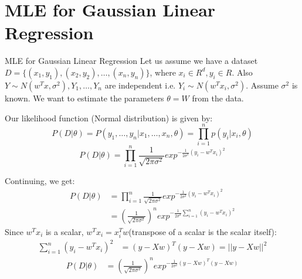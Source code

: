 \documentclass[handout]{beamer}
\begin{document}
\section{MLE for Gaussian Linear Regression}
\begin{frame}{MLE for Gaussian Linear Regression}
Let us assume we have a dataset $D = \{(x_1, y_1), (x_2,y_2), \ldots, (x_n, y_n)\}$, where $x_i\in R^d, y_i\in R$. Also $Y\sim N(w^Tx, \sigma^2), Y_1, \ldots, Y_n$ are independent i.e. $Y_i\sim N(w^Tx_i, \sigma^2)$. Assume $\sigma^2$ is known.
We want to estimate the parameters $\theta = W$ from the data.

Our likelihood function (Normal distribution) is given by:
\begin{equation}
P(D|\theta) = P(y_1,\ldots,y_n|x_1,\ldots,x_n,\theta) = \prod_{i=1}^n p(y_i|x_i, \theta) 
\end{equation}
\begin{equation}
P(D|\theta) = \prod_{i=1}^n\frac{1}{\sqrt{2\pi\sigma^2}}exp^{-\frac{1}{2\sigma^2}(y_i-w^Tx_i)^2}
\end{equation}

\end{frame}

\begin{frame}
    Continuing, we get:
    \begin{align*}
        P(D|\theta) &= \prod_{i=1}^n\frac{1}{\sqrt{2\pi\sigma^2}}exp^{-\frac{1}{2\sigma^2}(y_i-w^Tx_i)^2} \\
        &= \left(\frac{1}{\sqrt{2\pi\sigma^2}}\right)^{n}exp^{-\frac{1}{2\sigma^2}\sum_{i=1}^n(y_i-w^Tx_i)^2} 
    \end{align*}
    Since $w^Tx_i$ is a scalar, $w^Tx_i = x_i^Tw$(transpose of a scalar is the scalar itself):
    \begin{align*}
        \sum_{i=1}^n(y_i-w^Tx_i)^2 &= (y-Xw)^T(y-Xw) =||y-Xw||^2
    \end{align*}
    \begin{align*}
         P(D|\theta) &= \left(\frac{1}{\sqrt{2\pi\sigma^2}}\right)^{n}exp^{-\frac{1}{2\sigma^2}(y-Xw)^T(y-Xw)} 
    \end{align*}
\end{frame}
\end{document}
